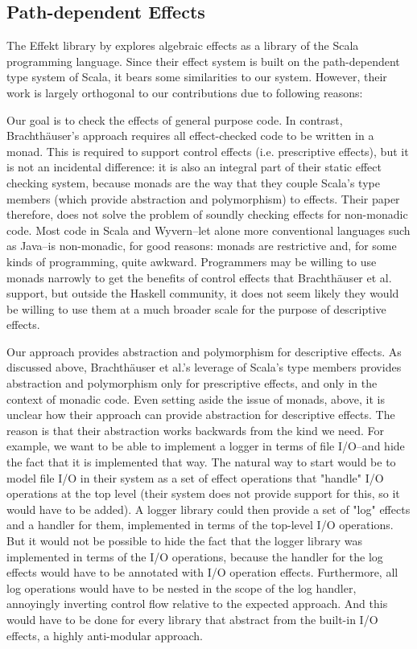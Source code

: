 \subsection{Path-dependent Effects}
The Effekt library by \citet{brachthauser20} explores algebraic effects as a library of the Scala programming language. Since their effect system is built on the path-dependent type system of Scala, it bears some similarities to our system. However, their work is largely orthogonal to our contributions due to following reasons: 

	 Our goal is to check the effects of general purpose code. In contrast, Brachthäuser's approach requires all effect-checked code to be written in a monad. This is required to support control effects (i.e. prescriptive effects), but it is not an incidental difference: it is also an integral part of their static effect checking system, because monads are the way that they couple Scala's type members (which provide abstraction and polymorphism) to effects. Their paper therefore, does not solve the problem of soundly checking effects for non-monadic code. Most code in Scala and Wyvern--let alone more conventional languages such as Java--is non-monadic, for good reasons: monads are restrictive and, for some kinds of programming, quite awkward. Programmers may be willing to use monads narrowly to get the benefits of control effects that Brachthäuser et al. support, but outside the Haskell community, it does not seem likely they would be willing to use them at a much broader scale for the purpose of descriptive effects.
	 
   Our approach provides abstraction and polymorphism for descriptive effects. As discussed above, Brachthäuser et al.'s leverage of Scala's type members provides abstraction and polymorphism only for prescriptive effects, and only in the context of monadic code. Even setting aside the issue of monads, above, it is unclear how their approach can provide abstraction for descriptive effects. The reason is that their abstraction works backwards from the kind we need. For example, we want to be able to implement a logger in terms of file I/O--and hide the fact that it is implemented that way. The natural way to start would be to model file I/O in their system as a set of effect operations that "handle" I/O operations at the top level (their system does not provide support for this, so it would have to be added). A logger library could then provide a set of "log" effects and a handler for them, implemented in terms of the top-level I/O operations. But it would not be possible to hide the fact that the logger library was implemented in terms of the I/O operations, because the handler for the log effects would have to be annotated with I/O operation effects. Furthermore, all log operations would have to be nested in the scope of the log handler, annoyingly inverting control flow relative to the expected approach. And this would have to be done for every library that abstract from the built-in I/O effects, a highly anti-modular approach.
	



